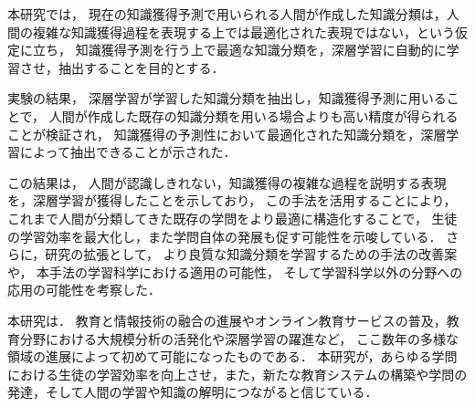 本研究では，
現在の知識獲得予測で用いられる人間が作成した知識分類は，人間の複雑な知識獲得過程を表現する上では最適化された表現ではない，という仮定に立ち，
知識獲得予測を行う上で最適な知識分類を，深層学習に自動的に学習させ，抽出することを目的とする．

実験の結果，
深層学習が学習した知識分類を抽出し，知識獲得予測に用いることで，
人間が作成した既存の知識分類を用いる場合よりも高い精度が得られることが検証され，
知識獲得の予測性において最適化された知識分類を，深層学習によって抽出できることが示された．

この結果は，
人間が認識しきれない，知識獲得の複雑な過程を説明する表現を，深層学習が獲得したことを示しており，
この手法を活用することにより，
これまで人間が分類してきた既存の学問をより最適に構造化することで，
生徒の学習効率を最大化し，また学問自体の発展も促す可能性を示唆している．
さらに，研究の拡張として，
より良質な知識分類を学習するための手法の改善案や，
本手法の学習科学における適用の可能性，
そして学習科学以外の分野への応用の可能性を考察した．


本研究は．
教育と情報技術の融合の進展やオンライン教育サービスの普及，教育分野における大規模分析の活発化や深層学習の躍進など，
ここ数年の多様な領域の進展によって初めて可能になったものである．
本研究が，あらゆる学問における生徒の学習効率を向上させ，また，新たな教育システムの構築や学問の発達，そして人間の学習や知識の解明につながると信じている．
